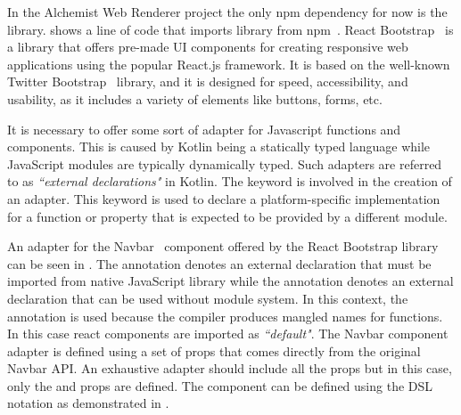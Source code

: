 In the Alchemist Web Renderer project the only npm dependency for now is the  library.  shows a line of code that imports library from npm~\cite{Usedepen41:online}.
React Bootstrap~\cite{reactboo79:online} is a library that offers pre-made UI components for creating responsive web applications using the popular React.js framework. It is based on the well-known Twitter Bootstrap~\cite{Bootstra57:online} library, and it is designed for speed, accessibility, and usability, as it includes a variety of elements like buttons, forms, etc.\newline

It is necessary to offer some sort of adapter for Javascript functions and components. This is caused by Kotlin being a statically typed language while JavaScript modules are typically dynamically typed. Such adapters are referred to as \textit{``external declarations"} in Kotlin. The  keyword is involved in the creation of an adapter. This keyword is used to declare a platform-specific implementation for a function or property that is expected to be provided by a different module.\newline





An adapter for the Navbar~\cite{ReactBoo29:online} component offered by the React Bootstrap library can be seen in . The  annotation denotes an external declaration that must be imported from native JavaScript library while the  annotation denotes an external declaration that can be used without module system. In this context, the  annotation is used because the compiler produces mangled names for functions. In this case react components are imported as \textit{``default"}. The Navbar component adapter is defined using a set of props that comes directly from the original Navbar API. An exhaustive adapter should include all the props but in this case, only the  and  props are defined. The component can be defined using the DSL notation as demonstrated in .\newline



